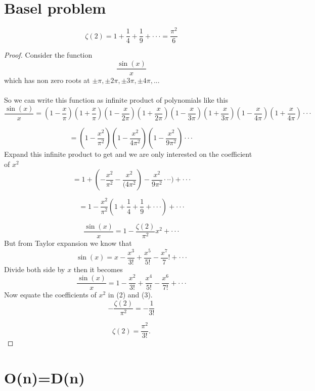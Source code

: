 \documentclass[12pt]{article}
\begin{document}
\section{Basel problem}
$$
\zeta(2)=1+ \frac{1}{4}+\frac{1}{9}+\cdot\cdot\cdot =\frac{\pi^2}{6}
$$
\begin{proof}
Consider the function
$$
\frac{\sin ⁡(x)}{x}$$
 which has non zero roots at $\pm\pi,\pm2\pi,\pm3\pi,\pm4\pi, ...$
\\~\\
So we can write this function as infinite product of polynomials like this
$$ \frac{\sin(x)}{x}=(1-\frac{x}{\pi})(1+\frac{x}{\pi})(1-\frac{x}{2\pi})(1+\frac{x}{2\pi})(1-\frac{x}{3\pi})(1+\frac{x}{3\pi})(1-\frac{x}{4\pi})(1+\frac{x}{4\pi})\cdot\cdot\cdot
$$

$$
= (1-\frac{x^2}{\pi^2})(1-\frac{x^2}{4\pi^2})(1-\frac{x^2}{9\pi^2})\cdot\cdot\cdot
$$
Expand this infinite product to get and we are only interested on the coefficient of $x^2$
$$
= 1+(-\frac{x^2}{\pi^2} -\frac{x^2}{(4\pi^2} )-\frac{x^2}{9\pi^2}\cdot\cdot\cdot)+ \cdot\cdot\cdot
$$

$$
= 1-\frac{x^2}{\pi^2}(1+\frac{1}{4}+\frac{1}{9}+\cdot\cdot\cdot)+\cdot\cdot\cdot
$$

\begin{equation} \label{eq:zeta}
\frac{\sin(x)}{x}= 1-\frac{\zeta(2)}{\pi^2}x^2+\cdot\cdot\cdot
\end{equation}
But from Taylor expansion we know that
$$
\sin(x)=x-\frac{x^3}{3!}+\frac{x^5}{5!}-\frac{x^7}{7}!+\cdot\cdot\cdot
$$
Divide both side by $x$ then it becomes
\begin{equation} \label{eq:zeta}
\frac{\sin ⁡(x)}{x}=1-\frac{x^2}{3!}+\frac{x^4}{5!}-\frac{x^6}{7!}+\cdot\cdot\cdot
\end{equation}
Now equate the coefficients of $x^2$ in (2) and (3).
$$
-\frac{\zeta(2)}{\pi^2}=-\frac{1}{3!}
$$

$$
\zeta(2)=\frac{\pi^2}{3!}.
$$
\end{proof}

\section{O(n)=D(n)}
\end{document}
